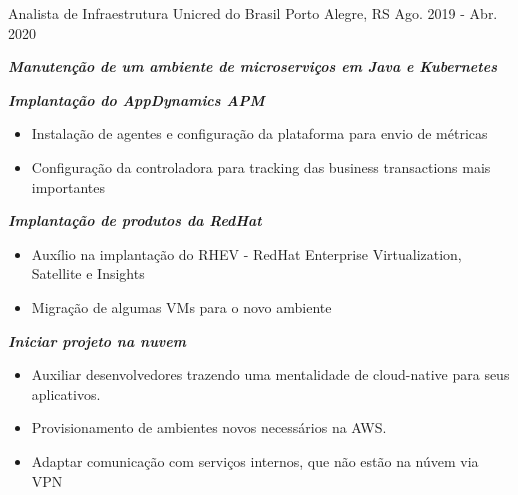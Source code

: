 \begin{cventries}
  \cventry
    {Analista de Infraestrutura}
    {Unicred do Brasil}
    {Porto Alegre, RS}
    {Ago. 2019 - Abr. 2020}
    {
      \begin{cvitems}
        \item \textit{\textbf{Manutenção de um ambiente de microserviços em Java e Kubernetes}}
        \item \textit{\textbf{Implantação do AppDynamics APM}}
        \begin{itemize}
            \item Instalação de agentes e configuração da plataforma para envio de métricas
            \item Configuração da controladora para tracking das business transactions mais importantes
        \end{itemize}
        \item \textit{\textbf{Implantação de produtos da RedHat}}
        \begin{itemize}
            \item Auxílio na implantação do RHEV - RedHat Enterprise Virtualization, Satellite e Insights
            \item Migração de algumas VMs para o novo ambiente
        \end{itemize}
        \item \textit{\textbf{Iniciar projeto na nuvem}}
        \begin{itemize}
            \item Auxiliar desenvolvedores trazendo uma mentalidade de cloud-native para seus aplicativos.
            \item Provisionamento de ambientes novos necessários na AWS.
            \item Adaptar comunicação com serviços internos, que não estão na núvem via VPN
        \end{itemize}
      \end{cvitems}
    }
    

\end{cventries}
